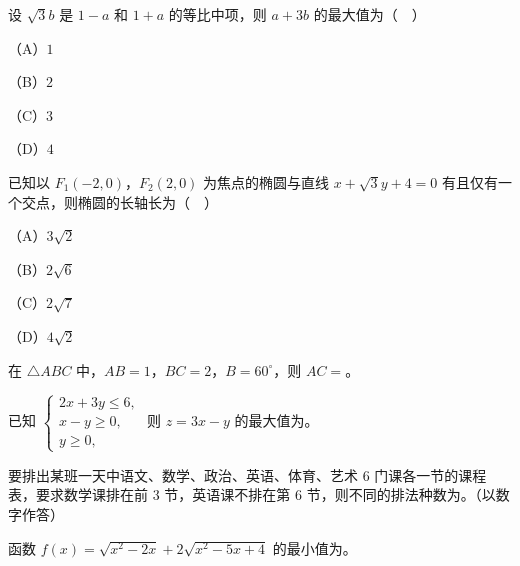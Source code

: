 \begin{question}
设 $\sqrt3b$ 是 $1-a$ 和 $1+a$ 的等比中项，则 $a+3b$ 的最大值为（　）

（A）$1$

（B）$2$

（C）$3$

（D）$4$

\end{question}
\begin{question}
已知以 $F_1(-2,0)$，$F_2(2,0)$ 为焦点的椭圆与直线 $x+\sqrt3y+4=0$ 有且仅有一个交点，则椭圆的长轴长为（　）

（A）$3\sqrt2$

（B）$2\sqrt6$

（C）$2\sqrt7$

（D）$4\sqrt2$

\end{question}

\begin{question}
在 $\triangle ABC$ 中，$AB=1$，$BC=2$，$B=60^\circ$，则 $AC=$\gkblank{}。

\end{question}
\begin{question}
已知 $\begin{cases}2x+3y\leqslant6,\\ x-y\geqslant0,\\ y\geqslant0,\end{cases}$ 则 $z=3x-y$ 的最大值为\gkblank{}。

\end{question}
\begin{question}
要排出某班一天中语文、数学、政治、英语、体育、艺术 $6$ 门课各一节的课程表，要求数学课排在前 $3$ 节，英语课不排在第 $6$ 节，则不同的排法种数为\gkblank{}。（以数字作答）

\end{question}
\begin{question}
函数 $f(x)=\sqrt{x^2-2x}+2\sqrt{x^2-5x+4}$ 的最小值为\gkblank{}。

\end{question}

